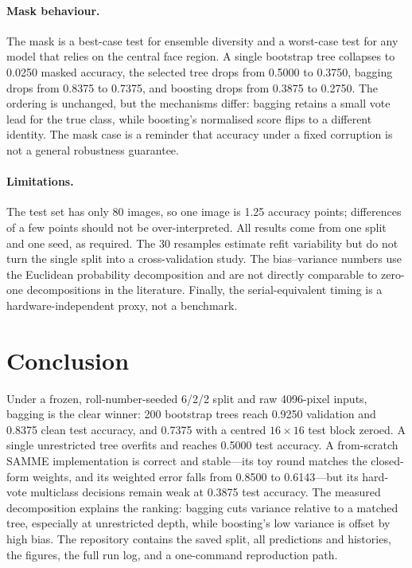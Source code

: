 \documentclass[10pt,twocolumn,letterpaper]{article}
\begin{document}
\paragraph{Mask behaviour.}  The mask is a best-case test for ensemble diversity
and a worst-case test for any model that relies on the central face region.  A
single bootstrap tree collapses to 0.0250 masked accuracy, the selected tree
drops from 0.5000 to 0.3750, bagging drops from 0.8375 to 0.7375, and boosting
drops from 0.3875 to 0.2750.  The ordering is unchanged, but the mechanisms
differ: bagging retains a small vote lead for the true class, while boosting's
normalised score flips to a different identity.  The mask case is a reminder
that accuracy under a fixed corruption is not a general robustness guarantee.

\paragraph{Limitations.}  The test set has only 80 images, so one image is 1.25
accuracy points; differences of a few points should not be over-interpreted.
All results come from one split and one seed, as required.  The 30 resamples
estimate refit variability but do not turn the single split into a
cross-validation study.  The bias--variance numbers use the Euclidean
probability decomposition and are not directly comparable to zero-one
decompositions in the literature.  Finally, the serial-equivalent timing is a
hardware-independent proxy, not a benchmark.

\section{Conclusion}

Under a frozen, roll-number-seeded 6/2/2 split and raw 4096-pixel inputs,
bagging is the clear winner: 200 bootstrap trees reach 0.9250 validation and
0.8375 clean test accuracy, and 0.7375 with a centred $16\times16$ test block
zeroed.  A single unrestricted tree overfits and reaches 0.5000 test accuracy.
A from-scratch SAMME implementation is correct and stable---its toy round
matches the closed-form weights, and its weighted error falls from 0.8500 to
0.6143---but its hard-vote multiclass decisions remain weak at 0.3875 test
accuracy.  The measured decomposition explains the ranking: bagging cuts
variance relative to a matched tree, especially at unrestricted depth, while
boosting's low variance is offset by high bias.  The repository contains the
saved split, all predictions and histories, the figures, the full run log, and
a one-command reproduction path.

{
\small


}
\end{document}
